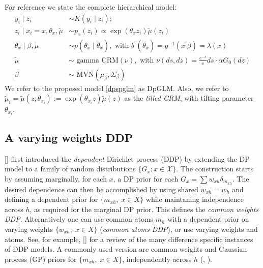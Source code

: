 \documentclass{article}[12pt]
\newcommand{\citeaa}[1]{\citeauthor{#1}, \href{cite.#1}{\textcolor{blue}{\citeyear{#1}}}}     %
\newcommand{\citeab}[1]{\citeauthor{#1} [\href{cite.#1}{\textcolor{blue}{\citeyear{#1}}}]}  %
\renewcommand{\th}{\theta}
\newcommand{\tmu}{\widetilde{\mu}}
\newcommand{\sx}{\mathcal{X}}
\renewcommand{\sx}{\mathcal{X}}
\begin{document}
For reference we state the complete hierarchical model: 
\begin{align}
\label{dpspglm}
  y_i \mid  z_i & \sim K(y_i \mid z_i); \\
  z_i \mid x_i = x, \theta_{x}, \tmu & \sim p_x(z_i) \propto
                                       \exp(\th_{x} z_i) \widetilde
                                       \mu(z_i) \nonumber\\ 
\theta_x \mid \beta, \tmu & \sim p(\theta_x \mid \widetilde \theta_x), \text{ with } {b^\prime}(\widetilde \theta_x) = g^{-1}(x^\prime \beta) = \lambda(x) \nonumber \\ 
\tmu & \sim \text{ gamma CRM}(\nu), \text{ with } \nu(ds, dz) = \frac{e^{-s}}{s} ds \cdot \alpha G_0(dz) \nonumber \\ 
\beta & \sim \text{ MVN}(\mu_\beta, \Sigma_\beta) 
\end{align}
We refer to the proposed model \eqref{dpspglm} as 
DpGLM. 
Also, we refer to  
$\tmu_i = \tmu(z; \theta_{x_i}) := \exp(\th_{x_i} z) \widetilde
\mu(z)$ as the \textit{titled CRM}, with tilting parameter
$\theta_{x_i}$.  


\subsection{A varying weights DDP}
\label{subsec:DDP}

\citeab{maceachern;2000} first introduced the
\textit{dependent} Dirichlet process (DDP) by extending the 
DP model to a family of random distributions $\{G_x: x \in \sx \}$.
The construction starts by assuming marginally, for each $x$, a DP
prior for each $G_x = \sum w_{xh} \delta_{m_{xh}}$.
The desired dependence can then be accomplished by using shared
$w_{xh}=w_h$ and defining a dependent prior for $\{m_{xh},\; x \in
X\}$ while maintaning independence across $h$, as required for the
marginal DP prior. This defines the {\it common weights DDP}.
Alternatively one can use common atoms $m_h$ with a dependent prior on
varying weights $\{w_{xh},\; x \in X\}$ ({\it common atoms DDP}), or
use varying weights and atoms. See, for example,
\citeab{quintana2022dependent} for a review of the many difference specific
instances of DDP models.
A commonly used version are common weights and Gaussian process
(GP) priors for $\{m_{xh},\; x \in X\}$, independently across $h$
(\citeaa{maceachern;2000}).
\end{document}
